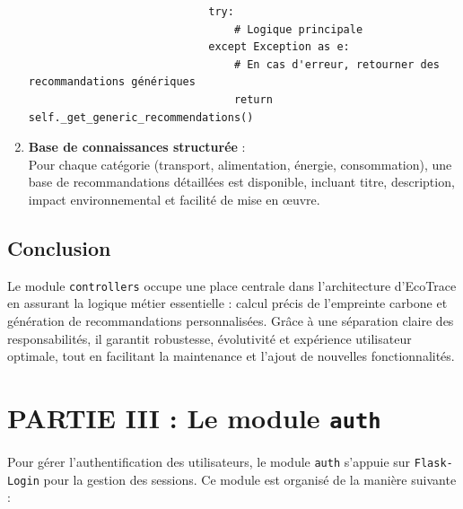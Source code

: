 \documentclass[a4paper,11pt]{article}
\begin{document}
\begin{enumerate}
                    \begin{tcolorbox}[colback=lightgray!6, colframe=black, left=-45mm, right=5mm, top=2mm, bottom=0mm, boxrule=0.1mm]
                        \begin{verbatim}
                            try:
                                # Logique principale
                            except Exception as e:
                                # En cas d'erreur, retourner des recommandations génériques
                                return self._get_generic_recommendations()
                        \end{verbatim}
                    \end{tcolorbox}

                \item \textbf{Base de connaissances structurée} :\\
                    Pour chaque catégorie (transport, alimentation, énergie, consommation), une base de recommandations détaillées est disponible, incluant titre, description, impact environnemental et facilité de mise en œuvre.
            \end{enumerate}

        \subsection{Conclusion}
            \begin{tcolorbox}[colback=lightgray!6, colframe=black, left=2mm, right=5mm, top=2mm, bottom=0mm, boxrule=0.1mm]
                Le module \texttt{controllers} occupe une place centrale dans l’architecture d’EcoTrace en assurant la logique métier essentielle : calcul précis de l’empreinte carbone et génération de recommandations personnalisées. Grâce à une séparation claire des responsabilités, il garantit robustesse, évolutivité et expérience utilisateur optimale, tout en facilitant la maintenance et l’ajout de nouvelles fonctionnalités.
            \end{tcolorbox}



        \newpage
        \section{PARTIE III : Le module \texttt{auth}}
            \noindent Pour gérer l'authentification des utilisateurs, le module \texttt{auth} s'appuie sur \texttt{Flask-Login} pour la gestion des sessions. Ce module est organisé de la manière suivante :
\end{document}
